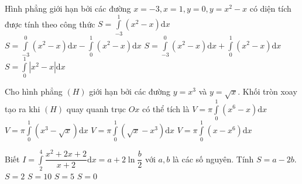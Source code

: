 \begin{ex}%
	Hình phẳng giới hạn bởi các đường $x=-3, x=1, y=0, y=x^2-x$ có diện tích được tính theo công thức
	\choice 
	{ $S = \displaystyle \int \limits_{-3}^{1} \left(x^2 -x \right) \mathrm{d} x $}
	{\True $S = \displaystyle \int \limits_{-3}^{0} \left(x^2 -x \right) \mathrm{d} x - \int \limits_{0}^{1} \left(x^2 -x \right) \mathrm{d} x$}
	{ $S = \displaystyle \int \limits_{-3}^{0} \left(x^2 -x \right) \mathrm{d} x + \int \limits_{0}^{1} \left(x^2 -x \right) \mathrm{d} x$}
	{ $S = \displaystyle \int \limits_{0}^{1} \left|x^2 -x \right| \mathrm{d} x$}
\end{ex}

\begin{ex}%
	Cho hình phẳng $(H)$ giới hạn bởi các đường $y=x^3$ và $y=\sqrt{x}$. Khối tròn xoay tạo ra khi $(H)$ quay quanh trục $Ox$ có thể tích là
	\choice 
	{$V=\pi \displaystyle \int \limits_0^1 \left( x^6 - x \right) \mathrm{d} x$}
	{$V=\pi \displaystyle \int \limits_0^1 \left( x^3 - \sqrt{x} \right) \mathrm{d} x$}
	{$V=\pi \displaystyle \int \limits_0^1 \left( \sqrt{x} - x^3 \right) \mathrm{d} x$}
	{\True $V=\pi \displaystyle \int \limits_0^1 \left( x - x^6 \right) \mathrm{d} x$}
\end{ex}

\begin{ex}%
	Biết $I=\displaystyle \int \limits_2^4  \dfrac{x^2+2x+2}{x+2} \mathrm{d} x = a+ 2\ln \dfrac{b}{2}$ với $a,b$ là các số nguyên. Tính $S=a-2b$.
	\choice 
	{$S=2$}
	{$S=10$}
	{$S=5$}
	{\True $S=0$}
\end{ex}

